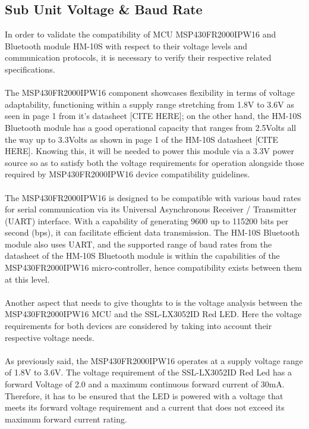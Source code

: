 \subsection{Sub Unit Voltage \& Baud Rate}
In order to validate the compatibility of MCU MSP430FR2000IPW16 and Bluetooth module HM-10S with respect to their voltage levels and communication protocols, it is necessary to verify their respective related specifications.\\\\
The MSP430FR2000IPW16 component showcases flexibility in terms of voltage adaptability, functioning within a supply range stretching from 1.8V to 3.6V as seen in page 1 from it’s datasheet [CITE HERE]; on the other hand, the HM-10S Bluetooth module has a good operational capacity that ranges from 2.5Volts all the way up to 3.3Volts as shown in page 1 of the HM-10S datasheet [CITE HERE]. Knowing this, it will be needed to power this module via a 3.3V power source so as to satisfy both the voltage requirements for operation alongside those required by MSP430FR2000IPW16 device compatibility guidelines.\\\\
The MSP430FR2000IPW16 is designed to be compatible with various baud rates for serial communication via its Universal Asynchronous Receiver / Transmitter (UART) interface. With a capability of generating 9600 up to 115200 bits per second (bps), it can facilitate efficient data transmission. The HM-10S Bluetooth module also uses UART, and the supported range of baud rates from the datasheet of the HM-10S Bluetooth module is within the capabilities of the MSP430FR2000IPW16 micro-controller, hence compatibility exists between them at this level.\\\\
Another aspect that needs to give thoughts to is the voltage analysis between the MSP430FR2000IPW16 MCU and the SSL-LX3052ID Red LED. Here the voltage requirements for both devices are considered by taking into account their respective voltage needs.\\\\
As previously said, the MSP430FR2000IPW16 operates at a supply voltage range of 1.8V to 3.6V. The voltage requirement of the SSL-LX3052ID Red Led has a forward Voltage of 2.0 and a maximum continuous forward current of 30mA. Therefore, it has to be ensured that the LED is powered with a voltage that meets its forward voltage requirement and a current that does not exceed its maximum forward current rating. \\\\
